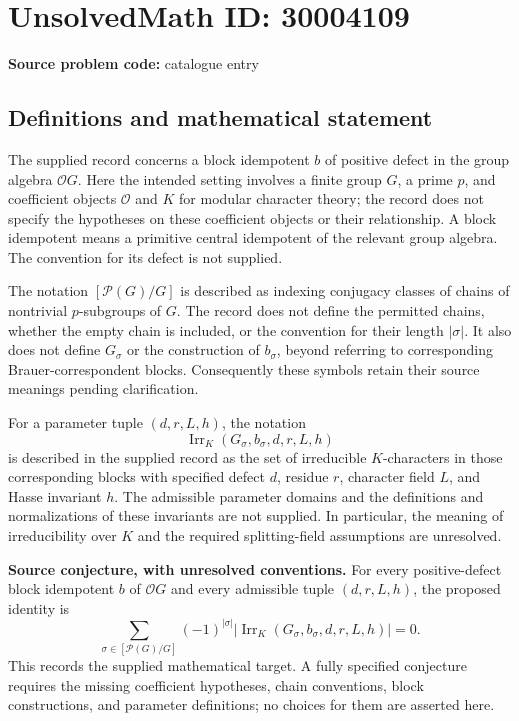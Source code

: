 \documentclass[11pt]{article}
\begin{document}
\section*{UnsolvedMath ID: 30004109}
\textbf{Source problem code:} catalogue entry
\subsection{Definitions and mathematical statement}
The supplied record concerns a block idempotent \(b\) of positive defect in the group algebra \(\mathcal{O}G\). Here the intended setting involves a finite group \(G\), a prime \(p\), and coefficient objects \(\mathcal{O}\) and \(K\) for modular character theory; the record does not specify the hypotheses on these coefficient objects or their relationship. A block idempotent means a primitive central idempotent of the relevant group algebra. The convention for its defect is not supplied.

The notation \([\mathcal{P}(G)/G]\) is described as indexing conjugacy classes of chains of nontrivial \(p\)-subgroups of \(G\). The record does not define the permitted chains, whether the empty chain is included, or the convention for their length \(|\sigma|\). It also does not define \(G_\sigma\) or the construction of \(b_\sigma\), beyond referring to corresponding Brauer-correspondent blocks. Consequently these symbols retain their source meanings pending clarification.

For a parameter tuple \((d,r,L,h)\), the notation
\[
\operatorname{Irr}_K(G_\sigma,b_\sigma,d,r,L,h)
\]
is described in the supplied record as the set of irreducible \(K\)-characters in those corresponding blocks with specified defect \(d\), residue \(r\), character field \(L\), and Hasse invariant \(h\). The admissible parameter domains and the definitions and normalizations of these invariants are not supplied. In particular, the meaning of irreducibility over \(K\) and the required splitting-field assumptions are unresolved.

\textbf{Source conjecture, with unresolved conventions.} For every positive-defect block idempotent \(b\) of \(\mathcal{O}G\) and every admissible tuple \((d,r,L,h)\), the proposed identity is
\[
\sum_{\sigma\in[\mathcal{P}(G)/G]}
(-1)^{|\sigma|}
\left|\operatorname{Irr}_K(G_\sigma,b_\sigma,d,r,L,h)\right|
=0.
\]
This records the supplied mathematical target. A fully specified conjecture requires the missing coefficient hypotheses, chain conventions, block constructions, and parameter definitions; no choices for them are asserted here.
\end{document}
